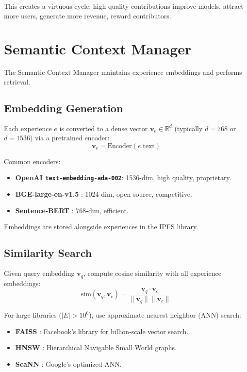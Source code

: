 \documentclass[11pt,a4paper]{article}
\begin{document}
This creates a virtuous cycle: high-quality contributions improve models, attract more users, generate more revenue, reward contributors.

\section{Semantic Context Manager}

The Semantic Context Manager maintains experience embeddings and performs retrieval.

\subsection{Embedding Generation}

Each experience $e$ is converted to a dense vector $\mathbf{v}_e \in \mathbb{R}^d$ (typically $d = 768$ or $d = 1536$) via a pretrained encoder:
\[
\mathbf{v}_e = \text{Encoder}(e.\text{text})
\]

Common encoders:
\begin{itemize}
\item \textbf{OpenAI \texttt{text-embedding-ada-002}}: 1536-dim, high quality, proprietary.
\item \textbf{BGE-large-en-v1.5} \cite{xiao2023bge}: 1024-dim, open-source, competitive.
\item \textbf{Sentence-BERT} \cite{reimers2019sentencebert}: 768-dim, efficient.
\end{itemize}

Embeddings are stored alongside experiences in the IPFS library.

\subsection{Similarity Search}

Given query embedding $\mathbf{v}_q$, compute cosine similarity with all experience embeddings:
\[
\text{sim}(\mathbf{v}_q, \mathbf{v}_e) = \frac{\mathbf{v}_q \cdot \mathbf{v}_e}{\|\mathbf{v}_q\| \|\mathbf{v}_e\|}
\]

For large libraries ($|E| > 10^6$), use approximate nearest neighbor (ANN) search:
\begin{itemize}
\item \textbf{FAISS} \cite{johnson2019faiss}: Facebook's library for billion-scale vector search.
\item \textbf{HNSW} \cite{malkov2018hnsw}: Hierarchical Navigable Small World graphs.
\item \textbf{ScaNN} \cite{guo2020scann}: Google's optimized ANN.
\end{itemize}
\end{document}
